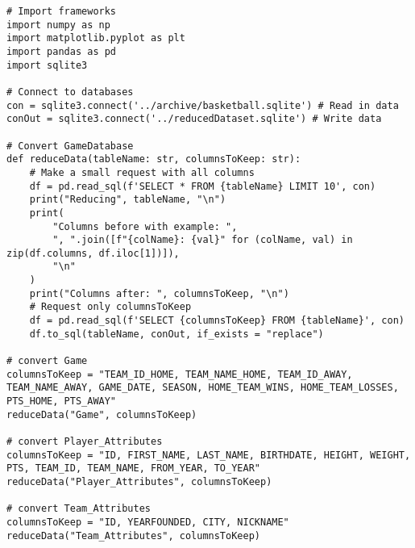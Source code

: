 \documentclass{article}
\begin{document}
\begin{verbatim}
# Import frameworks
import numpy as np
import matplotlib.pyplot as plt
import pandas as pd
import sqlite3

# Connect to databases
con = sqlite3.connect('../archive/basketball.sqlite') # Read in data
conOut = sqlite3.connect('../reducedDataset.sqlite') # Write data

# Convert GameDatabase
def reduceData(tableName: str, columnsToKeep: str):
    # Make a small request with all columns
    df = pd.read_sql(f'SELECT * FROM {tableName} LIMIT 10', con)
    print("Reducing", tableName, "\n")
    print(
        "Columns before with example: ",
        ", ".join([f"{colName}: {val}" for (colName, val) in zip(df.columns, df.iloc[1])]),
        "\n"
    )
    print("Columns after: ", columnsToKeep, "\n")
    # Request only columnsToKeep
    df = pd.read_sql(f'SELECT {columnsToKeep} FROM {tableName}', con) 
    df.to_sql(tableName, conOut, if_exists = "replace")

# convert Game
columnsToKeep = "TEAM_ID_HOME, TEAM_NAME_HOME, TEAM_ID_AWAY, TEAM_NAME_AWAY, GAME_DATE, SEASON, HOME_TEAM_WINS, HOME_TEAM_LOSSES, PTS_HOME, PTS_AWAY"
reduceData("Game", columnsToKeep)

# convert Player_Attributes
columnsToKeep = "ID, FIRST_NAME, LAST_NAME, BIRTHDATE, HEIGHT, WEIGHT, PTS, TEAM_ID, TEAM_NAME, FROM_YEAR, TO_YEAR"
reduceData("Player_Attributes", columnsToKeep)

# convert Team_Attributes
columnsToKeep = "ID, YEARFOUNDED, CITY, NICKNAME"
reduceData("Team_Attributes", columnsToKeep)

\end{verbatim}
\end{document}
